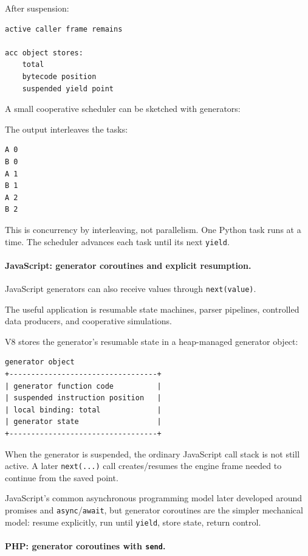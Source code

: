 After suspension:

\begin{verbatim}
active caller frame remains

acc object stores:
    total
    bytecode position
    suspended yield point
\end{verbatim}

A small cooperative scheduler can be sketched with generators:

The output interleaves the tasks:

\begin{verbatim}
A 0
B 0
A 1
B 1
A 2
B 2
\end{verbatim}

This is concurrency by interleaving, not parallelism. One Python task runs at a time. The scheduler advances each task until its next \texttt{yield}.

\paragraph{JavaScript: generator coroutines and explicit resumption.}

JavaScript generators can also receive values through \texttt{next(value)}.

The useful application is resumable state machines, parser pipelines, controlled data producers, and cooperative simulations.

V8 stores the generator's resumable state in a heap-managed generator object:

\begin{verbatim}
generator object
+----------------------------------+
| generator function code          |
| suspended instruction position   |
| local binding: total             |
| generator state                  |
+----------------------------------+
\end{verbatim}

When the generator is suspended, the ordinary JavaScript call stack is not still active. A later \texttt{next(...)} call creates/resumes the engine frame needed to continue from the saved point.

JavaScript's common asynchronous programming model later developed around promises and \texttt{async}/\texttt{await}, but generator coroutines are the simpler mechanical model: resume explicitly, run until \texttt{yield}, store state, return control.

\paragraph{PHP: generator coroutines with \texttt{send}.}

